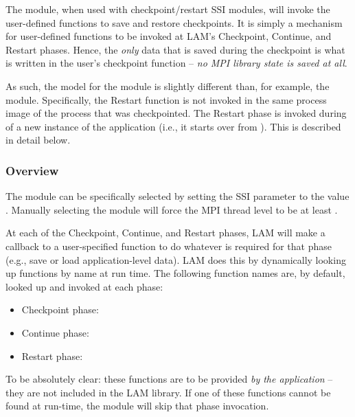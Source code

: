 The  module, when used with checkpoint/restart SSI
modules, will invoke the user-defined functions to save and restore
checkpoints.  It is simply a mechanism for user-defined functions to
be invoked at LAM's Checkpoint, Continue, and Restart phases.  Hence,
the {\em only} data that is saved during the checkpoint is what is
written in the user's checkpoint function -- {\em no MPI library state
is saved at all}.

As such, the model for the  module is slightly different
than, for example, the  module.  Specifically, the Restart
function is not invoked in the same process image of the process that
was checkpointed.  The Restart phase is invoked during
 of a new instance of the application (i.e., it
starts over from ).  This is described in detail below.


\subsubsection{Overview}

The  module can be specifically selected by setting the 
 SSI parameter to the value .  Manually 
selecting the  module will force the MPI thread level to be at 
least .

At each of the Checkpoint, Continue, and Restart phases, LAM will make
a callback to a user-specified function to do whatever is required for
that phase (e.g., save or load application-level data).  LAM does this
by dynamically looking up functions by name at run time.  The
following function names are, by default, looked up and invoked at
each phase:

\begin{itemize}
\item Checkpoint phase: 
\item Continue phase: 
\item Restart phase: 
\end{itemize}

To be absolutely clear: these functions are to be provided {\em by the
  application} -- they are not included in the LAM library.  If one of
these functions cannot be found at run-time, the  module
will skip that phase invocation.

